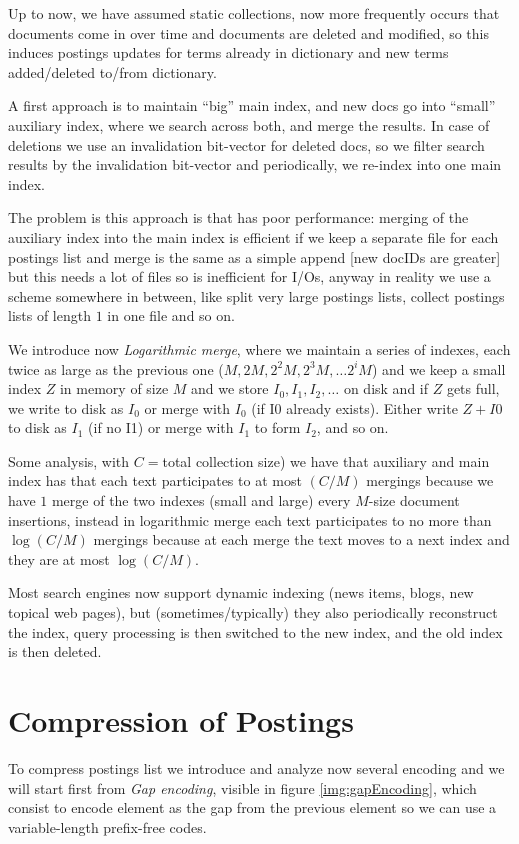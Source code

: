 Up to now, we have assumed static collections, now more frequently occurs that documents come in over time
and documents are deleted and modified, so this induces postings updates for terms already in dictionary
and new terms added/deleted to/from dictionary.

A first approach is to maintain “big” main index, and new docs go into “small” auxiliary index, where 
we search across both, and merge the results.\newline
In case of deletions we use an invalidation bit-vector for deleted docs, so we filter search results
by the invalidation bit-vector and periodically, we re-index into one main index.

The problem is this approach is that has poor performance: merging of the auxiliary index into the main index
is efficient if we keep a separate file for each postings list and merge is the same as a simple append
[new docIDs are greater] but this needs a lot of files so is inefficient for I/Os, anyway
in reality we use a scheme somewhere in between, like split very large postings lists, 
collect postings lists of length $1$ in one file and so on.

We introduce now \emph{Logarithmic merge}, where we maintain a series of indexes, 
each twice as large as the previous one ($M, 2M , 2^2 M, 2^3 M, \dots 2^iM$) and we keep a small index
$Z$ in memory of size $M$ and we store $I_0, I_1, I_2, \dots$ on disk and if $Z$ gets full, 
we write to disk as $I_0$ or merge with $I_0$ (if I0 already exists).\newline
Either write $Z + I0$ to disk as $I_1$ (if no I1) or merge with $I_1$ to form $I_2$, and so on.

Some analysis, with $C = $total collection size) we have that auxiliary and main index has that 
each text participates to at most $(C/M)$ mergings because we have $1$ merge of the two indexes (small and large)
every $M$-size document insertions, instead in logarithmic merge each text participates to no more than
$\log (C/M)$ mergings because at each merge the text moves to a next index and they are at most $\log (C/M)$.

Most search engines now support dynamic indexing (news items, blogs, new topical web pages), 
but (sometimes/typically) they also periodically reconstruct the index, query processing is then
switched to the new index, and the old index is then deleted.

\section{Compression of Postings}
To compress postings list we introduce and analyze now several encoding 
and we will start first from \emph{Gap encoding}, visible in figure 
\ref{img:gapEncoding}, which consist to encode element as the gap from
the previous element so we can use a variable-length prefix-free codes.

